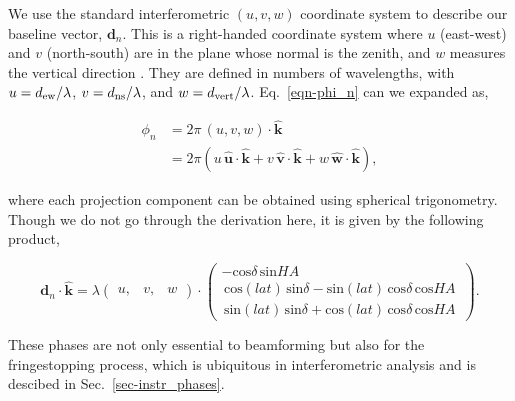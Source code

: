 We use the standard interferometric $(u, v, w)$ coordinate system 
to describe our baseline vector, $\mathbf{d}_n$. This is a 
right-handed coordinate system where $u$ (east-west) and $v$ (north-south) are in the plane 
whose normal is the zenith, and $w$ measures the vertical direction \citep{1986isra.book.....T}.
They are defined in numbers of wavelengths, with
$u = d_{\rm ew} / \lambda$, $v = d_{\rm ns} / \lambda$, 
and $w = d_{\rm vert} / \lambda$. Eq.~\ref{eqn-phi_n} can we expanded 
as,

\begin{align}   
\phi_n &= 2\pi \, (u, v, w) \cdot \mathbf{\hat{k}}\\
&= 2 \pi \left ( 
u \, \mathit{\mathbf{\hat{u}}} \cdot \mathbf{\hat{k}} + 
v \, \mathbf{\hat{v}} \cdot \mathbf{\hat{k}} + 
w \, \mathbf{\hat{w}} \cdot \mathbf{\hat{k}} 
\right ),
\end{align}

\noindent where each projection component can be obtained 
using spherical trigonometry. Though we do not go through the
derivation here, it is given by the following product,

\begin{equation}
\label{eq-fringestop_phase}
\mathbf{d}_n \cdot  {\mathbf{\hat{k}}} = \lambda \begin{pmatrix}
u, & v, & w
\end{pmatrix}  \cdot \begin{pmatrix} 
-\mathrm{cos}\delta \,\mathrm{sin}HA \\ 
\, \mathrm{cos}(lat) \, \mathrm{sin}\delta - \mathrm{sin}(lat) \, \mathrm{cos}\delta \, \mathrm{cos}HA \,\\
\, \mathrm{sin}(lat) \, \mathrm{sin}\delta + \mathrm{cos}(lat) \, \mathrm{cos}\delta \, \mathrm{cos} HA\,
\end{pmatrix} .
\end{equation}

These phases are not only essential to beamforming but 
also for the fringestopping process, which is ubiquitous in 
interferometric analysis and is descibed in Sec.~\ref{sec-instr_phases}.


